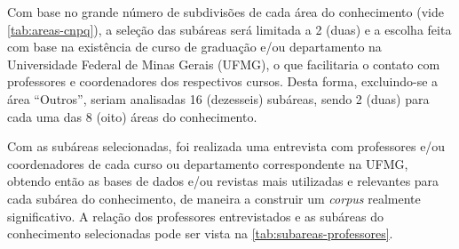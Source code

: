 Com base no grande número de subdivisões de cada área do conhecimento (vide \autoref{tab:areas-cnpq}), a seleção das subáreas será limitada a 2 (duas) e a escolha feita com base na existência de curso de graduação e/ou departamento na Universidade Federal de Minas Gerais (UFMG), o que facilitaria o contato com professores e coordenadores dos respectivos cursos. Desta forma, excluindo-se a área ``Outros'', seriam analisadas 16 (dezesseis) subáreas, sendo 2 (duas) para cada uma das 8 (oito) áreas do conhecimento.

Com as subáreas selecionadas, foi realizada uma entrevista com professores e/ou coordenadores de cada curso ou departamento correspondente na UFMG, obtendo então as bases de dados e/ou revistas mais utilizadas e relevantes para cada subárea do conhecimento, de maneira a construir um \emph{corpus} realmente significativo. A relação dos professores entrevistados e as subáreas do conhecimento selecionadas pode ser vista na \autoref{tab:subareas-professores}.

